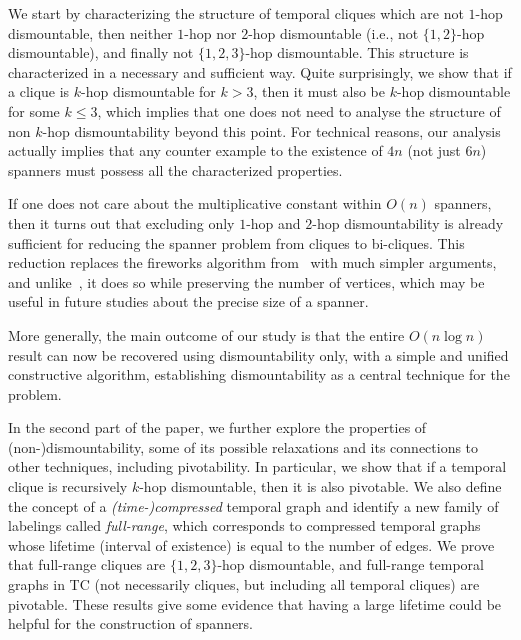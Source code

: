 \documentclass[USenglish, a4paper, thm-restate,numberwithinsect, cleveref]{lipics-v2021}
\begin{document}
We start by characterizing the structure of temporal cliques which are not $1$-hop dismountable, then neither $1$-hop nor $2$-hop dismountable (i.e., not $\{1,2\}$-hop dismountable), and finally not $\{1,2,3\}$-hop dismountable. This structure is characterized in a necessary and sufficient way. Quite surprisingly, we show that if a clique is $k$-hop dismountable for $k>3$, then it must also be $k$-hop dismountable for some $k\le 3$, which implies that one does not need to analyse the structure of non $k$-hop dismountability beyond this point. For technical reasons, our analysis actually implies that any counter example to the existence of $4n$ (not just $6n$) spanners must possess all the characterized properties.

If one does not care about the multiplicative constant within $O(n)$ spanners, then it turns out that excluding only $1$-hop and $2$-hop dismountability is already sufficient for reducing the spanner problem from cliques to bi-cliques. This reduction replaces the fireworks algorithm from~\cite{CPS19} with much simpler arguments, and unlike~\cite{Hasso}, it does so while preserving the number of vertices, which may be useful in future studies about the precise size of a spanner.

More generally, the main outcome of our study is that the entire $O(n \log n)$ result can now be recovered using dismountability only, with a simple and unified constructive algorithm, establishing dismountability as a central technique for the problem.

In the second part of the paper, we further explore the properties of (non-)dismountability, some of its possible relaxations and its connections to other techniques, including pivotability. In particular, we show that if a temporal clique is recursively $k$-hop dismountable, then it is also pivotable.
We also define the concept of a \emph{(time-)compressed} temporal graph and identify a new family of labelings called \emph{full-range}, which corresponds to compressed temporal graphs whose lifetime (interval of existence) is equal to the number of edges. We prove that full-range cliques are $\{1,2,3\}$-hop dismountable, and full-range temporal graphs in \textsf{TC} (not necessarily cliques, but including all temporal cliques) are pivotable. These results give some evidence that having a large lifetime could be helpful for the construction of spanners.
\end{document}
